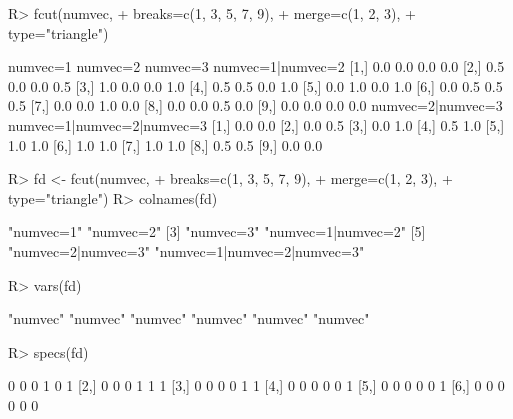 \documentclass{article}\usepackage[]{graphicx}\usepackage[]{color}
\begin{document}
\begin{Schunk}
% --begin: "fcut.merge2"
\begin{Sinput}
R> fcut(numvec,
+       breaks=c(1, 3, 5, 7, 9),
+       merge=c(1, 2, 3),
+       type="triangle")
\end{Sinput}
\begin{Soutput}
      numvec=1 numvec=2 numvec=3 numvec=1|numvec=2
 [1,]      0.0      0.0      0.0               0.0
 [2,]      0.5      0.0      0.0               0.5
 [3,]      1.0      0.0      0.0               1.0
 [4,]      0.5      0.5      0.0               1.0
 [5,]      0.0      1.0      0.0               1.0
 [6,]      0.0      0.5      0.5               0.5
 [7,]      0.0      0.0      1.0               0.0
 [8,]      0.0      0.0      0.5               0.0
 [9,]      0.0      0.0      0.0               0.0
      numvec=2|numvec=3 numvec=1|numvec=2|numvec=3
 [1,]               0.0                        0.0
 [2,]               0.0                        0.5
 [3,]               0.0                        1.0
 [4,]               0.5                        1.0
 [5,]               1.0                        1.0
 [6,]               1.0                        1.0
 [7,]               1.0                        1.0
 [8,]               0.5                        0.5
 [9,]               0.0                        0.0
\end{Soutput}
%
% --end: "fcut.merge2"
\end{Schunk}

\begin{Schunk}
% --begin: "fcut.varsspecs"
\begin{Sinput}
R> fd <- fcut(numvec,
+             breaks=c(1, 3, 5, 7, 9),
+             merge=c(1, 2, 3),
+             type="triangle")
R> colnames(fd)
\end{Sinput}
\begin{Soutput}
[1] "numvec=1"                   "numvec=2"                  
[3] "numvec=3"                   "numvec=1|numvec=2"         
[5] "numvec=2|numvec=3"          "numvec=1|numvec=2|numvec=3"
\end{Soutput}
\begin{Sinput}
R> vars(fd)
\end{Sinput}
\begin{Soutput}
[1] "numvec" "numvec" "numvec" "numvec" "numvec" "numvec"
\end{Soutput}
\begin{Sinput}
R> specs(fd)
\end{Sinput}
\begin{Soutput}
     [,1] [,2] [,3] [,4] [,5] [,6]
[1,]    0    0    0    1    0    1
[2,]    0    0    0    1    1    1
[3,]    0    0    0    0    1    1
[4,]    0    0    0    0    0    1
[5,]    0    0    0    0    0    1
[6,]    0    0    0    0    0    0
\end{Soutput}
%
% --end: "fcut.varsspecs"
\end{Schunk}
\end{document}
